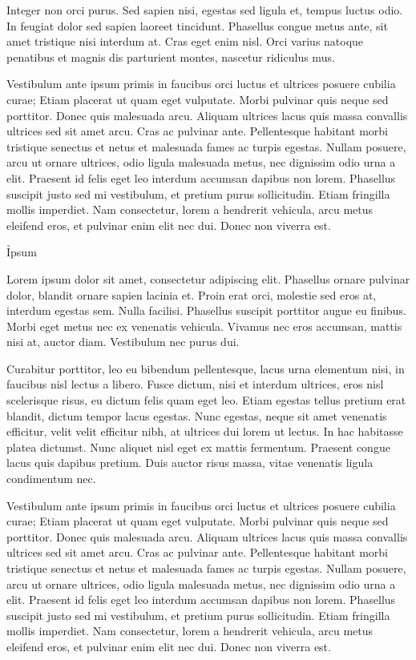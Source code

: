 \documentclass{novel}
\begin{document}
Integer non orci purus. Sed sapien nisi, egestas sed ligula et, tempus luctus odio. In feugiat dolor sed sapien laoreet tincidunt. Phasellus congue metus ante, sit amet tristique nisi interdum at. Cras eget enim nisl. Orci varius natoque penatibus et magnis dis parturient montes, nascetur ridiculus mus.

Vestibulum ante ipsum primis in faucibus orci luctus et ultrices posuere cubilia curae; Etiam placerat ut quam eget vulputate. Morbi pulvinar quis neque sed porttitor. Donec quis malesuada arcu. Aliquam ultrices lacus quis massa convallis ultrices sed sit amet arcu. Cras ac pulvinar ante. Pellentesque habitant morbi tristique senectus et netus et malesuada fames ac turpis egestas. Nullam posuere, arcu ut ornare ultrices, odio ligula malesuada metus, nec dignissim odio urna a elit. Praesent id felis eget leo interdum accumsan dapibus non lorem. Phasellus suscipit justo sed mi vestibulum, et pretium purus sollicitudin. Etiam fringilla mollis imperdiet. Nam consectetur, lorem a hendrerit vehicula, arcu metus eleifend eros, et pulvinar enim elit nec dui. Donec non viverra est.

\h{Ipsum}

Lorem ipsum dolor sit amet, consectetur adipiscing elit. Phasellus ornare pulvinar dolor, blandit ornare sapien lacinia et. Proin erat orci, molestie sed eros at, interdum egestas sem. Nulla facilisi. Phasellus suscipit porttitor augue eu finibus. Morbi eget metus nec ex venenatis vehicula. Vivamus nec eros accumsan, mattis nisi at, auctor diam. Vestibulum nec purus dui.

Curabitur porttitor, leo eu bibendum pellentesque, lacus urna elementum nisi, in faucibus nisl lectus a libero. Fusce dictum, nisi et interdum ultrices, eros nisl scelerisque risus, eu dictum felis quam eget leo. Etiam egestas tellus pretium erat blandit, dictum tempor lacus egestas. Nunc egestas, neque sit amet venenatis efficitur, velit velit efficitur nibh, at ultrices dui lorem ut lectus. In hac habitasse platea dictumst. Nunc aliquet nisl eget ex mattis fermentum. Praesent congue lacus quis dapibus pretium. Duis auctor risus massa, vitae venenatis ligula condimentum nec.

Vestibulum ante ipsum primis in faucibus orci luctus et ultrices posuere cubilia curae; Etiam placerat ut quam eget vulputate. Morbi pulvinar quis neque sed porttitor. Donec quis malesuada arcu. Aliquam ultrices lacus quis massa convallis ultrices sed sit amet arcu. Cras ac pulvinar ante. Pellentesque habitant morbi tristique senectus et netus et malesuada fames ac turpis egestas. Nullam posuere, arcu ut ornare ultrices, odio ligula malesuada metus, nec dignissim odio urna a elit. Praesent id felis eget leo interdum accumsan dapibus non lorem. Phasellus suscipit justo sed mi vestibulum, et pretium purus sollicitudin. Etiam fringilla mollis imperdiet. Nam consectetur, lorem a hendrerit vehicula, arcu metus eleifend eros, et pulvinar enim elit nec dui. Donec non viverra est.
\end{document}
